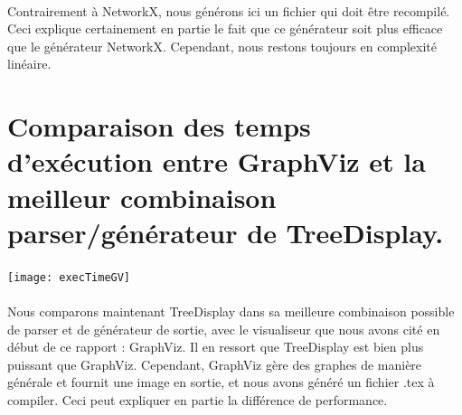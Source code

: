 \paragraph{} Contrairement à NetworkX, nous générons ici un fichier qui doit être recompilé. Ceci explique certainement en partie le fait que ce générateur soit plus efficace que le générateur NetworkX. Cependant, nous restons toujours en complexité linéaire.

	\section{Comparaison des temps d'exécution entre GraphViz et la meilleur combinaison parser/générateur de TreeDisplay.}
	
\begin{center}

\texttt{[image: execTimeGV]}

\end{center}

\paragraph{} Nous comparons maintenant TreeDisplay dans sa meilleure combinaison possible de parser et de générateur de sortie, avec le visualiseur que nous avons cité en début de ce rapport : GraphViz. Il en ressort que TreeDisplay est bien plus puissant que GraphViz. Cependant, GraphViz gère des graphes de manière générale et fournit une image en sortie, et nous avons généré un fichier .tex à compiler. Ceci peut expliquer en partie la différence de performance.